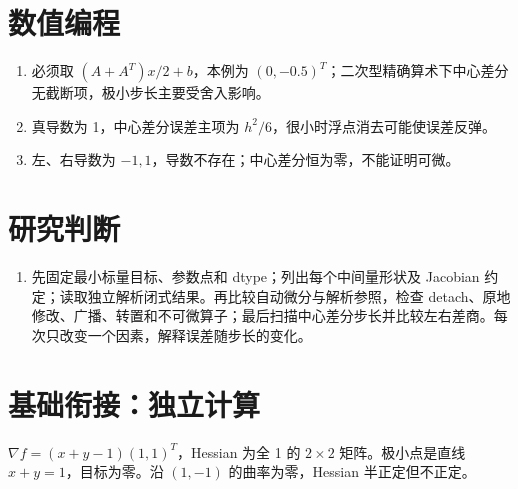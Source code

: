 \section*{数值编程}
\begin{enumerate}[leftmargin=*]
  \item 必须取 $(A+A^T)x/2+b$，本例为 $(0,-0.5)^T$；二次型精确算术下中心差分无截断项，极小步长主要受舍入影响。
  \item 真导数为 1，中心差分误差主项为 $h^2/6$，很小时浮点消去可能使误差反弹。
  \item 左、右导数为 $-1,1$，导数不存在；中心差分恒为零，不能证明可微。
\end{enumerate}

\section*{研究判断}
\begin{enumerate}[leftmargin=*]
  \item 先固定最小标量目标、参数点和 dtype；列出每个中间量形状及 Jacobian 约定；读取独立解析闭式结果。再比较自动微分与解析参照，检查 detach、原地修改、广播、转置和不可微算子；最后扫描中心差分步长并比较左右差商。每次只改变一个因素，解释误差随步长的变化。
\end{enumerate}

\section*{基础衔接：独立计算}
$\nabla f=(x+y-1)(1,1)^T$，Hessian 为全 1 的 $2\times2$ 矩阵。极小点是直线 $x+y=1$，目标为零。沿 $(1,-1)$ 的曲率为零，Hessian 半正定但不正定。

